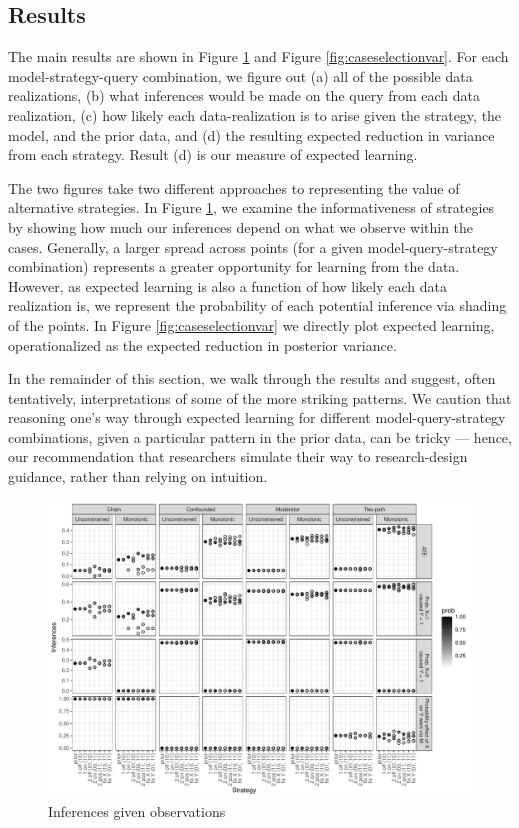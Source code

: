 \documentclass[
  12pt,
]{book}
\begin{document}
\hypertarget{results-1}{%
\subsection{Results}\label{results-1}}

The main results are shown in Figure \ref{fig:caseselectionest} and Figure \ref{fig:caseselectionvar}. For each model-strategy-query combination, we figure out (a) all of the possible data realizations, (b) what inferences would be made on the query from each data realization, (c) how likely each data-realization is to arise given the strategy, the model, and the prior data, and (d) the resulting expected reduction in variance from each strategy. Result (d) is our measure of expected learning.

The two figures take two different approaches to representing the value of alternative strategies. In Figure \ref{fig:caseselectionest}, we examine the informativeness of strategies by showing how much our inferences depend on what we observe within the cases. Generally, a larger spread across points (for a given model-query-strategy combination) represents a greater opportunity for learning from the data. However, as expected learning is also a function of how likely each data realization is, we represent the probability of each potential inference via shading of the points. In Figure \ref{fig:caseselectionvar} we directly plot expected learning, operationalized as the expected reduction in posterior variance.

In the remainder of this section, we walk through the results and suggest, often tentatively, interpretations of some of the more striking patterns. We caution that reasoning one's way through expected learning for different model-query-strategy combinations, given a particular pattern in the prior data, can be tricky --- hence, our recommendation that researchers simulate their way to research-design guidance, rather than relying on intuition.

\begin{figure}

{\centering \includegraphics{ii_files/figure-latex/caseselectionest-1} 

}

\caption{Inferences given observations}\label{fig:caseselectionest}
\end{figure}
\end{document}
